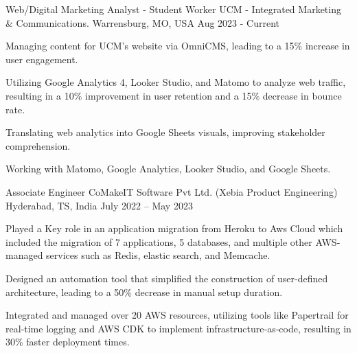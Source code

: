 

\begin{cventries}

  \cventry
    {Web/Digital Marketing Analyst - Student Worker} %
    {UCM - Integrated Marketing \& Communications.} %
    {Warrensburg, MO, USA} %
    {Aug 2023 - Current} %
    {
      \begin{cvitems} %
        \item {Managing content for UCM’s website via OmniCMS, leading to a 15\% increase in user engagement.}
        \item {Utilizing Google Analytics 4, Looker Studio, and Matomo to analyze web traffic, resulting in a 10\% improvement in user retention and a 15\% decrease in bounce rate.}
        \item {Translating web analytics into Google Sheets visuals, improving stakeholder comprehension.}
        \item {Working with Matomo, Google Analytics, Looker Studio, and Google Sheets.}
      \end{cvitems}
    }
    \cventry
    {Associate Engineer} %
    {CoMakeIT Software Pvt Ltd. (Xebia Product Engineering)} %
    {Hyderabad, TS, India} %
    {July 2022 – May 2023} %
    {
      \begin{cvitems} %
        \item {Played a Key role in an application migration from Heroku to Aws Cloud which included the migration of 7 applications, 5 databases, and multiple other AWS‐managed services such as Redis, elastic search, and Memcache.}
        \item {Designed an automation tool that simplified the construction of user‐defined architecture, leading to a 50\% decrease in manual setup duration.}
          \item {Integrated and managed over 20 AWS resources, utilizing tools like Papertrail for real‐time logging and AWS CDK to implement infrastructure‐as‐code, resulting in 30\% faster deployment times.}

\end{cvitems}}
\end{cventries}
